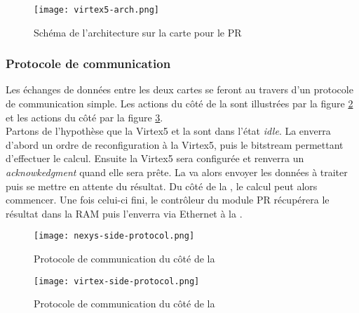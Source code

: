 \begin{figure}[h!]
\centering
\texttt{[image: virtex5-arch.png]}
\caption{Schéma de l'architecture sur la carte pour le PR}
\label{virtex5-arch}
\end{figure}

\subsubsection{Protocole de communication}

Les échanges de données entre les deux cartes se feront au travers d'un protocole de communication simple. Les actions du côté de la \nexys{} sont illustrées par la figure \ref{nexys-side-protocol} et les actions du côté \virtex{} par la figure \ref{virtex-side-protocol}.\\
Partons de l'hypothèse que la Virtex5 et la \nexys{} sont dans l'état \textit{idle}. La \nexys{} enverra d'abord un ordre de reconfiguration à la Virtex5, puis le bitstream permettant d'effectuer le calcul. Ensuite la Virtex5 sera configurée et renverra un \textit{acknowkedgment} quand elle sera prête. La \nexys{} va alors envoyer les données à traiter puis se mettre en attente du résultat. Du côté de la \virtex{}, le calcul peut alors commencer. Une fois celui-ci fini, le contrôleur du module PR récupérera le résultat dans la RAM puis l'enverra via Ethernet à la \nexys{}.

\begin{figure}[h!]
\centering
\texttt{[image: nexys-side-protocol.png]}
\caption{Protocole de communication du côté de la \nexys{}}
\label{nexys-side-protocol}
\end{figure}

\begin{figure}[h!]
\centering
\texttt{[image: virtex-side-protocol.png]}
\caption{Protocole de communication du côté de la \virtex{}}
\label{virtex-side-protocol}
\end{figure}
